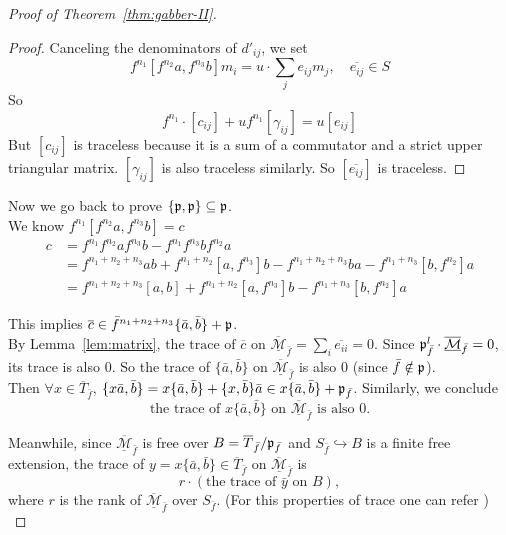 \begin{proof}[Proof of Theorem~\ref{thm:gabber-II}]
\begin{proof}
		\noindent Canceling the denominators of $d'_{ij}$, we set
		\[
			f^{n_1} [f^{n_2}a, f^{n_3}b] m_i = u \cdot \sum_j e_{ij} m_j, \quad \overline{e_{ij}} \in S
		\]
		So
		\[
			f^{n_1} \cdot [c_{ij}] + u f^{n_1} [\gamma_{ij}] = u [e_{ij}]
		\]
		But $[c_{ij}]$ is traceless because it is a sum of a commutator and a strict upper triangular matrix.
		$[\gamma_{ij}]$ is also traceless similarly.
		So $[\overline{e_{ij}}]$ is traceless.
	\end{proof}

	\noindent Now we go back to prove $\{\frak{p}, \frak{p}\} \subseteq \frak{p}$.\\

	\noindent We know
	$  f^{n_1} [f^{n_2}a, f^{n_3}b] = c $
	\begin{align*}
		c & = f^{n_1} f^{n_2} a f^{n_3} b - f^{n_1} f^{n_3} b f^{n_2} a                                          \\
		  & = f^{n_1+n_2+n_3} ab + f^{n_1+n_2} [a, f^{n_3}] b  - f^{n_1+n_2+n_3} ba - f^{n_1+n_3} [b, f^{n_2}] a \\
		  & = f^{n_1+n_2+n_3} [a, b] + f^{n_1+n_2} [a, f^{n_3}] b - f^{n_1+n_3} [b, f^{n_2}] a
	\end{align*}

	\noindent This implies $\overline{c} \in \bar{f}^{n_1+n_2+n_3} \{\bar{a}, \bar{b}\} + \frak{p}$.\\

	\noindent By Lemma~\ref{lem:matrix}, $\text{the trace of } \overline{c} \text{ on } \overline{\underline{\mathcal{M}}}_{\bar f} = \sum_i \overline{e_{ii}} = 0$.
	Since $\frak{p}^l_{\bar f} \cdot \overline{\underline{\mathcal{M}}}_{\bar f} = 0$, its trace is also 0.
	So the trace of $\{\bar{a}, \bar{b}\}$ on $\overline{\underline{\mathcal{M}}}_{\bar f}$ is also 0 (since $\bar{f} \notin \frak{p}$).\\

	\noindent Then $\forall x \in \overline{T}_{\bar f}$, $\{x\bar{a}, \bar{b}\} = x\{\bar{a}, \bar{b}\} + \{x, \bar{b}\}\bar{a} \in x\{\bar{a}, \bar{b}\} + \frak{p}_{\bar f}$.
	Similarly, we conclude
	\[
		\text{the trace of } x\{\bar{a}, \bar{b}\} \text{ on } \overline{\underline{\mathcal{M}}}_{\bar f} \text{ is also } 0.
	\]

	\noindent Meanwhile, since $\overline{\underline{\mathcal{M}}}_{\bar f}$ is free over $B = \overline{T}_{\bar f} / \frak{p}_{\bar f}$ and $S_{\bar f} \hookrightarrow B$ is a finite free extension, the trace of $y = x\{\bar{a}, \bar{b}\} \in \overline{T}_{\bar f}$ on $\overline{\underline{\mathcal{M}}}_{\bar f}$ is
	\[
		r \cdot (\text{the trace of } \bar{y} \text{ on } B),
	\]
	where $r$ is the rank of $\overline{\underline{\mathcal{M}}}_{\bar f}$ over $S_{\bar f}$.
	(For this properties of trace one can refer \cite[Theorem 7.8.5]{li2019algebraic})\\


\end{proof}
